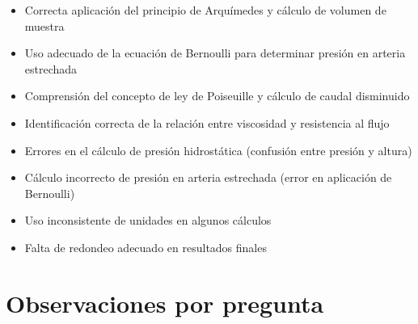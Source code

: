 \documentclass[11pt,a4paper]{article}
\begin{document}
\vspace{4pt}
\begin{minipage}[t]{0.48\linewidth}
  \begin{tcolorbox}[cajaFortaleza, title={Fortalezas}]
\begin{itemize}[leftmargin=1.5em, itemsep=2pt]
  \item Correcta aplicación del principio de Arquímedes y cálculo de volumen de muestra
  \item Uso adecuado de la ecuación de Bernoulli para determinar presión en arteria estrechada
  \item Comprensión del concepto de ley de Poiseuille y cálculo de caudal disminuido
  \item Identificación correcta de la relación entre viscosidad y resistencia al flujo
\end{itemize}
  \end{tcolorbox}
\end{minipage}
\hfill
\begin{minipage}[t]{0.48\linewidth}
  \begin{tcolorbox}[cajaMejora, title={Areas de mejora}]
\begin{itemize}[leftmargin=1.5em, itemsep=2pt]
  \item Errores en el cálculo de presión hidrostática (confusión entre presión y altura)
  \item Cálculo incorrecto de presión en arteria estrechada (error en aplicación de Bernoulli)
  \item Uso inconsistente de unidades en algunos cálculos
  \item Falta de redondeo adecuado en resultados finales
\end{itemize}
  \end{tcolorbox}
\end{minipage}

\section*{Observaciones por pregunta}
\end{document}
